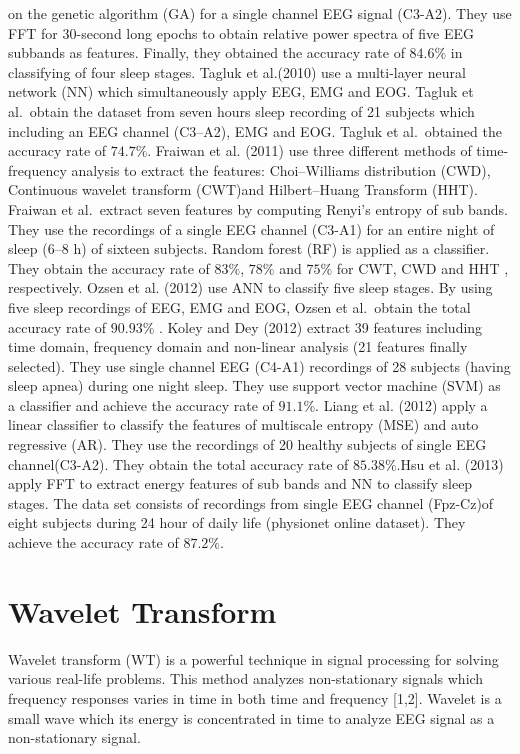 \documentclass[12pt,letterpaper]{article}
\begin{document}
on the genetic algorithm (GA) for a single channel EEG signal (C3-A2). They use FFT for 30-second long epochs to obtain  relative power spectra of five EEG subbands as features. Finally, they obtained the accuracy rate of $84.6\%$ in classifying of four sleep stages.  Tagluk et al.(2010) use a multi-layer neural network (NN) which simultaneously apply EEG, EMG and EOG. Tagluk et al.\ obtain the dataset from seven hours sleep recording of 21 subjects which including an EEG channel (C3–A2), EMG and EOG. Tagluk et al.\ obtained the accuracy rate of $74.7\%$. Fraiwan et al. (2011) use three different methods of time-frequency analysis to extract the features: Choi–Williams distribution (CWD), Continuous wavelet transform (CWT)and Hilbert–Huang Transform (HHT). Fraiwan et al.\ extract seven features by computing Renyi’s entropy of sub bands. They use the recordings of a single EEG channel (C3-A1) for an entire night of sleep (6–8 h) of sixteen subjects. Random forest (RF) is applied as a classifier. They obtain the accuracy rate of $83\%$, $78\%$ and $75\%$ for CWT, CWD and HHT , respectively. Ozsen et al. (2012) use ANN to classify five sleep stages. By using five sleep recordings of EEG, EMG and EOG, Ozsen et al.\ obtain the total accuracy rate of $90.93\%$ . Koley and Dey (2012) extract 39 features including time domain, frequency domain and non-linear analysis (21 features finally selected). They use single channel EEG (C4-A1) recordings of 28 subjects (having sleep apnea) during one night sleep. They use support vector machine (SVM) as a classifier and achieve the accuracy rate of $91.1\%$. Liang et al. (2012) apply a linear classifier to classify the features of multiscale entropy (MSE) and auto regressive (AR). They use the recordings of 20 healthy subjects of single EEG channel(C3-A2). They obtain the total accuracy rate of $85.38\%$.Hsu et al. (2013) apply FFT to extract energy features of sub bands and NN to classify sleep stages. The data set consists of recordings from single EEG channel (Fpz-Cz)of eight subjects during 24 hour of daily life (physionet online dataset). They achieve the accuracy rate of $87.2\%$. 






\section*{Wavelet Transform}

Wavelet transform (WT) is a powerful technique in signal processing for solving various real-life problems. This method analyzes non-stationary signals which frequency responses varies in time in both time and frequency [1,2]. Wavelet is a small wave which its energy is concentrated in time to analyze EEG signal as a non-stationary signal.
\end{document}

